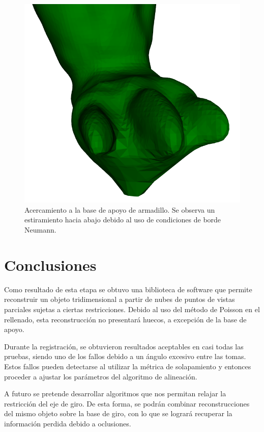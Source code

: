 		\begin{figure}
			\centering
			\includegraphics[max width=.5\linewidth, max height=.25\textheight, keepaspectratio]
				{img/arma_foot}
			\caption{\label{fig:base}Acercamiento a la base de apoyo de armadillo. Se observa un estiramiento hacia abajo debido al uso de condiciones de borde Neumann.}
		\end{figure}



	\section{Conclusiones}
		Como resultado de esta etapa se obtuvo una biblioteca de software que
		permite reconstruir un objeto tridimensional a partir de nubes
		de puntos de vistas parciales sujetas a ciertas restricciones.
		Debido al uso del método de Poisson en el rellenado, esta
		reconstrucción no presentará huecos, a excepción de la base de apoyo.

		Durante la registración, se obtuvieron resultados aceptables en casi todas las pruebas, 
		siendo uno de los fallos debido a un ángulo excesivo entre las tomas.
		Estos fallos pueden detectarse al utilizar la métrica de solapamiento y entonces proceder
		a ajustar los parámetros del algoritmo de alineación.

		A futuro se pretende desarrollar algoritmos que nos permitan relajar la
		restricción del eje de giro.
		De esta forma, se podrán combinar reconstrucciones del mismo objeto
		sobre la base de giro, con lo que se logrará recuperar la información
		perdida debido a oclusiones.

